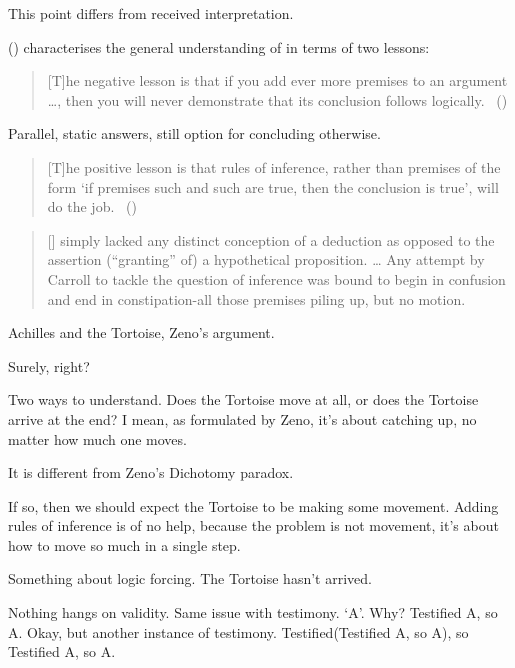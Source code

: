 \begin{note}
  This point differs from received interpretation.

  \citeauthor{Wieland:2013vf} (\citeyear{Wieland:2013vf}) characterises the general understanding of \textcite{Carroll:1895uj} in terms of two lessons:
  \begin{quote}
    [T]he negative lesson is that if you add ever more premises to an argument \dots, then you will never demonstrate that its conclusion follows logically.\newline
    \mbox{ }\hfill\mbox{(\citeyear[984]{Wieland:2013vf})}
  \end{quote}

  Parallel, static answers, still option for concluding otherwise.

  \begin{quote}
    [T]he positive lesson is that rules of inference, rather than premises of the form `if premises such and such are true, then the conclusion is true', will do the job.\newline
    \mbox{ }\hfill\mbox{(\citeyear[984]{Wieland:2013vf})}
  \end{quote}

  \begin{quote}
    [\citeauthor{Carroll:1895uj}] simply lacked any distinct conception of a deduction as opposed to the assertion (``granting'' of) a hypothetical proposition.
    \dots
    Any attempt by Carroll to tackle the question of inference was bound to begin in confusion and end in constipation-all those premises piling up, but no motion.
  \end{quote}

  Achilles and the Tortoise, Zeno's argument.

  Surely, right?

  Two ways to understand.
  Does the Tortoise move at all, or does the Tortoise arrive at the end?
  I mean, as formulated by Zeno, it's about catching up, no matter how much one moves.

  It is different from Zeno's Dichotomy paradox.


  If so, then we should expect the Tortoise to be making some movement.
  Adding rules of inference is of no help, because the problem is not movement, it's about how to move so much in a single step.
\end{note}

\begin{note}
  \color{red}
  Something about logic forcing.
  The Tortoise hasn't arrived.

  Nothing hangs on validity.
  Same issue with testimony.
  `A'.
  Why?
  Testified A, so A.
  Okay, but another instance of testimony.
  Testified(Testified A, so A), so Testified A, so A.
\end{note}

